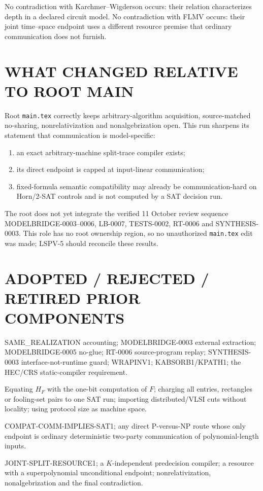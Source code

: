 \documentclass[11pt]{article}
\begin{document}
No contradiction with Karchmer--Wigderson occurs: their relation
characterizes depth in a declared circuit model.  No contradiction with
FLMV occurs: their joint time--space endpoint uses a different resource
premise that ordinary communication does not furnish.

\section{WHAT CHANGED RELATIVE TO ROOT MAIN}
Root \texttt{main.tex} correctly keeps arbitrary-algorithm acquisition,
source-matched no-sharing, nonrelativization and nonalgebrization open.  This
run sharpens its statement that communication is model-specific:
\begin{enumerate}[leftmargin=*]
\item an exact arbitrary-machine split-trace compiler exists;
\item its direct endpoint is capped at input-linear communication;
\item fixed-formula semantic compatibility may already be communication-hard
on Horn/2-SAT controls and is not computed by a SAT decision run.
\end{enumerate}
The root does not yet integrate the verified 11 October review sequence
MODELBRIDGE-0003--0006, LB-0007, TESTS-0002, RT-0006 and SYNTHESIS-0003.
This role has no root ownership region, so no unauthorized \texttt{main.tex}
edit was made; LSPV-5 should reconcile these results.

\section{ADOPTED / REJECTED / RETIRED PRIOR COMPONENTS}
\begin{description}[leftmargin=3.5cm,style=nextline]
\item[ADOPTED.] SAME\_REALIZATION accounting; MODELBRIDGE-0003 external
extraction; MODELBRIDGE-0005 no-glue; RT-0006 source-program replay;
SYNTHESIS-0003 interface-not-runtime guard; WRAPINV1; KABSORB1/KPATH1;
the HEC/CRS static-compiler requirement.
\item[REJECTED.] Equating $H_F$ with the one-bit computation of $F$; charging
all entries, rectangles or fooling-set pairs to one SAT run; importing
distributed/VLSI cuts without locality; using protocol size as machine space.
\item[FALSIFIED/RETIRED.] \textsf{COMPAT-COMM-IMPLIES-SAT1}; any direct
P-versus-NP route whose only endpoint is ordinary deterministic two-party
communication of polynomial-length inputs.
\item[OPEN.] \textsf{JOINT-SPLIT-RESOURCE1}; a $K$-independent predecision
compiler; a resource with a superpolynomial unconditional endpoint;
nonrelativization, nonalgebrization and the final contradiction.
\end{description}
\end{document}
